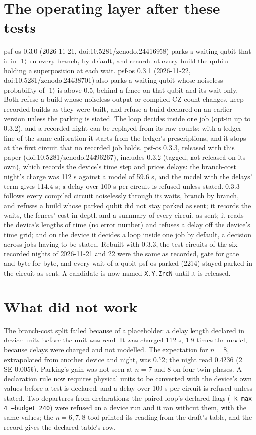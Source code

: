 \documentclass[10pt,a4paper]{article}
\newcommand{\ket}[1]{|#1\rangle}
\begin{document}
\section{The operating layer after these tests}\label{sec:psfos}
psf-os 0.3.0 (2026-11-21, doi:10.5281/zenodo.24416958) parks a waiting qubit that is in $\ket{1}$ on every branch, by
default, and records at every build the qubits holding a superposition at each wait. psf-os 0.3.1 (2026-11-22,
doi:10.5281/zenodo.24438701) also parks a waiting qubit whose noiseless probability of $\ket{1}$ is above 0.5, behind a
fence on that qubit and its wait only. Both refuse a build whose noiseless output or compiled CZ count changes, keep
recorded builds as they were built, and refuse a build declared on an earlier version unless the parking is stated. The loop decides inside one job (opt-in up to 0.3.2), and a recorded night can be replayed from its raw counts: with a
ledger line of the same calibration it starts from the ledger's prescriptions, and it stops at the first circuit that
no recorded job holds. psf-os 0.3.3, released with this paper (doi:10.5281/zenodo.24496267), includes 0.3.2 (tagged, not released on its own), which records the
device's time step and prices delays: the branch-cost night's charge was 112 s against a model of 59.6 s, and the model
with the delays' term gives 114.4 s; a delay over 100 \textmu s per circuit is refused unless stated. 0.3.3 follows every
compiled circuit noiselessly through its waits, branch by branch, and refuses a build whose parked qubit did not stay
parked as sent; it records the waits, the fences' cost in depth and a summary of every circuit as sent; it reads the
device's lengths of time (no error number) and refuses a delay off the device's time grid; and on the device it decides
a loop inside one job by default, a decision across jobs having to be stated. Rebuilt with 0.3.3, the test circuits of the six recorded nights of 2026-11-21 and 22 were the same as recorded, gate
for gate and byte for byte, and every wait of a qubit psf-os parked (2214) stayed parked in the circuit as sent. A candidate is now named \texttt{X.Y.ZrcN} until it is released.

\section{What did not work}\label{sec:failed}
The branch-cost split failed because of a placeholder: a delay length declared in device units before the unit was read. It was charged 112 s, 1.9 times the model, because delays were charged and not modelled. The expectation for $n = 8$, extrapolated from another device and night, was 0.72; the night read 0.4236 (2 SE 0.0056). Parking's gain was not seen at $n = 7$ and 8 on four twin phases. A declaration rule now requires
physical units to be converted with the device's own values before a test is declared, and a delay over 100 \textmu s
per circuit is refused unless stated. Two departures from declarations: the paired loop's declared flags
(\texttt{--k-max 4 --budget 240}) were refused on a device run and it ran without them, with the same values; the $n = 6,7,8$
tool printed its reading from the draft's table, and the record gives the declared table's row.
\end{document}
